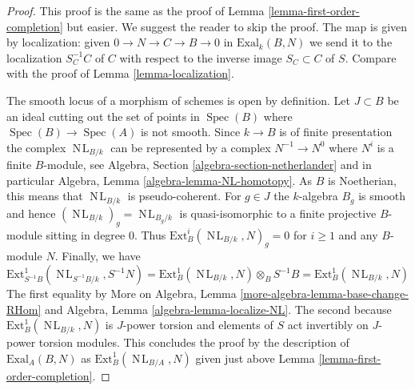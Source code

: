 \documentclass[10pt,a4paper]{amsart}
\theoremstyle{plain}
\theoremstyle{definition}
\theoremstyle{remark}
\numberwithin{equation}{subsection}
\def\Spec{\mathop{\mathrm{Spec}}}
\def\NL{\mathop{N\!L}\nolimits}
\begin{document}
\begin{proof}
This proof is the same as the proof of
Lemma \ref{lemma-first-order-completion} but easier. We suggest the
reader to skip the proof.
The map is given by localization: given $0 \to N \to C \to B \to 0$
in $\text{Exal}_k(B, N)$ we send it to the localization $S_C^{-1}C$
of $C$ with respect to the inverse image $S_C \subset C$ of $S$.
Compare with the proof of Lemma \ref{lemma-localization}.

\medskip\noindent
The smooth locus of a morphism of schemes is open by definition.
Let $J \subset B$ be an ideal cutting out the set of points
in $\Spec(B)$ where $\Spec(B) \to \Spec(A)$ is not smooth.
Since $k \to B$ is of finite presentation the complex
$\NL_{B/k}$ can be represented by a complex
$N^{-1} \to N^0$ where $N^i$ is a finite $B$-module, see
Algebra, Section \ref{algebra-section-netherlander} and
in particular
Algebra, Lemma \ref{algebra-lemma-NL-homotopy}.
As $B$ is Noetherian, this means that $\NL_{B/k}$
is pseudo-coherent. For $g \in J$ the $k$-algebra $B_g$
is smooth and hence $(\NL_{B/k})_g = \NL_{B_g/k}$
is quasi-isomorphic to a finite projective $B$-module sitting in degree $0$.
Thus $\text{Ext}^i_B(\NL_{B/k}, N)_g = 0$ for $i \geq 1$
and any $B$-module $N$. Finally, we have
$$
\text{Ext}^1_{S^{-1}B}(\NL_{S^{-1}B/k}, S^{-1}N) =
\text{Ext}^1_B(\NL_{B/k}, N) \otimes_B S^{-1}B =
\text{Ext}^1_B(\NL_{B/k}, N)
$$
The first equality by
More on Algebra, Lemma \ref{more-algebra-lemma-base-change-RHom}
and Algebra, Lemma \ref{algebra-lemma-localize-NL}.
The second because $\text{Ext}^1_B(\NL_{B/k}, N)$ is $J$-power
torsion and elements of $S$ act invertibly on $J$-power torsion modules.
This concludes the proof by the description of $\text{Exal}_A(B, N)$
as $\text{Ext}^1_B(\NL_{B/A}, N)$ given just above
Lemma \ref{lemma-first-order-completion}.
\end{proof}
\end{document}
